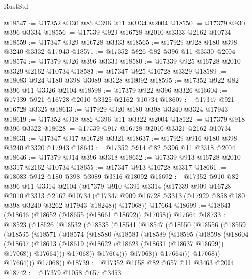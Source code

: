 \begin{lexlean}{RustStd}
\begin{coremodule}
@18547 := @17352 @930 @82 @396 @11 @3334 @2004
@18550 := @17379 @930 @396 @3334
@18556 := @17339 @929 @16728 @2010 @3333 @2162 @10734
@18559 := @17347 @929 @16728 @3333
@18565 := @17929 @928 @180 @398 @3240 @3332 @17943
@18571 := @17352 @926 @82 @396 @11 @3330 @2004
@18574 := @17379 @926 @396 @3330
@18580 := @17339 @925 @16728 @2010 @3329 @2162 @10734
@18583 := @17347 @925 @16728 @3329
@18589 := @18083 @924 @180 @398 @3089 @3328 @18092
@18595 := @17352 @922 @82 @396 @11 @3326 @2004
@18598 := @17379 @922 @396 @3326
@18604 := @17339 @921 @16728 @2010 @3325 @2162 @10734
@18607 := @17347 @921 @16728 @3325
@18613 := @17929 @920 @180 @398 @3240 @3324 @17943
@18619 := @17352 @918 @82 @396 @11 @3322 @2004
@18622 := @17379 @918 @396 @3322
@18628 := @17339 @917 @16728 @2010 @3321 @2162 @10734
@18631 := @17347 @917 @16728 @3321
@18637 := @17929 @916 @180 @398 @3240 @3320 @17943
@18643 := @17352 @914 @82 @396 @11 @3318 @2004
@18646 := @17379 @914 @396 @3318
@18652 := @17339 @913 @16728 @2010 @3317 @2162 @10734
@18655 := @17347 @913 @16728 @3317
@18661 := @18083 @912 @180 @398 @3089 @3316 @18092
@18692 := @17352
    @910
    @82
    @396
    @11
    @3314
    @2004
    (@17379
      @910
      @396
      @3314
      (@17339
        @909
        @16728
        @2010
        @3313
        @2162
        @10734
        (@17347 @909 @16728 @3313 (@17929 @858 @180 @398 @3240 @3262 @17943 @18248))
        @17068))
    @17664
@18699 := @18643 (@18646 (@18652 (@18655 (@18661 @18692)) @17068)) @17664
@18733 := @18523
    (@18526
      (@18532
        (@18535
          (@18541
            (@18547
              (@18550
                (@18556
                  (@18559
                    (@18565
                      (@18571
                        (@18574
                          (@18580
                            (@18583
                              (@18589
                                (@18595
                                  (@18598
                                    (@18604
                                      (@18607
                                        (@18613
                                          (@18619
                                            (@18622 (@18628 (@18631 (@18637 @18699)) @17068))
                                            @17664)))
                                      @17068))
                                  @17664)))
                            @17068))
                        @17664)))
                  @17068))
              @17664)))
        @17068))
@18739 := @17352 @1058 @82 @657 @11 @3463 @2004
@18742 := @17379 @1058 @657 @3463

\end{coremodule}
\end{lexlean}
